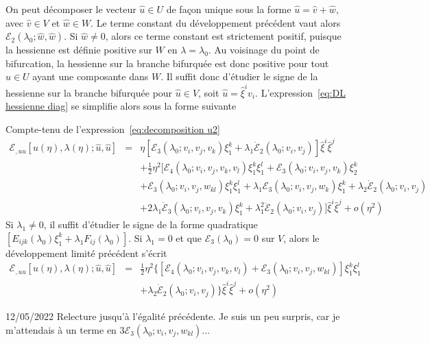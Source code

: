\documentclass{article}
\newcommand{\nobracket}{}
\newcommand{\nocomma}{}
\newcommand{\textdots}{...}
\begin{document}
On peut d{\'e}composer le vecteur $\hat{u} \in U$ de fa{\c c}on unique sous la
forme $\hat{u} = \hat{v} + \hat{w}$, avec $\hat{v} \in V$ et $\hat{w} \in W$.
Le terme constant du d{\'e}veloppement pr{\'e}c{\'e}dent vaut alors
$\mathcal{E}_2 (\lambda_0 ; \hat{w}, \hat{w})$. Si $\hat{w} \neq 0$, alors ce
terme constant est strictement positif, puisque la hessienne est d{\'e}finie
positive sur $W$ en $\lambda = \lambda_0$. Au voisinage du point de
bifurcation, la hessienne sur la branche bifurqu{\'e}e est donc positive pour
tout $\hat{u} \in U$ ayant une composante dans $W$. Il suffit donc
d'{\'e}tudier le signe de la hessienne sur la branche bifurqu{\'e}e pour
$\hat{u} \in V$, soit $\hat{u} = \hat{\xi}^i v_i$. L'expression~\eqref{eq:DL
hessienne diag} se simplifie alors sous la forme suivante

Compte-tenu de l'expression~\eqref{eq:decomposition u2}
\begin{eqnarray}
  \mathcal{E}_{, u \nocomma u} [u (\eta), \lambda (\eta) ; \hat{u}, \hat{u}] &
  = & \eta [\mathcal{E}_3 (\lambda_0 ; v_i, v_j, v_k) \xi_1^k + \lambda_1
  \dot{\mathcal{E}}_2 (\lambda_0 ; v_i, v_j)]  \hat{\xi}^i  \hat{\xi}^j
  \nonumber\\
  &  & + \tfrac{1}{2} \eta^2  [\mathcal{E}_4 (\lambda_0 ; v_i, v_j, v_k, v_l)
  \xi_1^k \xi_1^l +\mathcal{E}_3 (\lambda_0 ; v_i, v_j, v_k) \xi_2^k
  \nobracket \nonumber\\
  &  & +\mathcal{E}_3 (\lambda_0 ; v_i, v_j, w_{k \nocomma l}) \xi_1^k
  \xi_1^l + \lambda_1 \mathcal{E}_3 (\lambda_0 ; v_i, v_j, w_k) \xi_1^k +
  \lambda_2  \dot{\mathcal{E}}_2 (\lambda_0 ; v_i, v_j) \nonumber\\
  &  & \nobracket + 2 \lambda_1  \dot{\mathcal{E}}_3 (\lambda_0 ; v_i, v_j,
  v_k) \xi_1^k + \lambda_1^2  \ddot{\mathcal{E}}_2 (\lambda_0 ; v_i, v_j)]
  \hat{\xi}^i  \hat{\xi}^j + o (\eta^2) \nonumber
\end{eqnarray}
Si $\lambda_1 \neq 0$, il suffit d'{\'e}tudier le signe de la forme
quadratique $[E_{i \nocomma j \nocomma k} (\lambda_0) \xi_1^k + \lambda_1 F_{i
\nocomma j} (\lambda_0)] .$ Si $\lambda_1 = 0$ et que $\mathcal{E}_3
(\lambda_0) = 0$ sur $V$, alors le d{\'e}veloppement limit{\'e}
pr{\'e}c{\'e}dent s'{\'e}crit
\begin{eqnarray}
  \mathcal{E}_{, u \nocomma u} [u (\eta), \lambda (\eta) ; \hat{u}, \hat{u}] &
  = & \tfrac{1}{2} \eta^2  \{ [\mathcal{E}_4 (\lambda_0 ; v_i, v_j, v_k, v_l)
  \nobracket +\mathcal{E}_3 (\lambda_0 ; v_i, v_j, w_{k \nocomma l})] \xi_1^k
  \xi_1^l \nonumber\\
  &  & + \nobracket \lambda_2  \dot{\mathcal{E}}_2 (\lambda_0 ; v_i, v_j) \}
  \hat{\xi}^i  \hat{\xi}^j + o (\eta^2) \nonumber
\end{eqnarray}
\begin{tmframed}
  12/05/2022 Relecture jusqu'{\`a} l'{\'e}galit{\'e} pr{\'e}c{\'e}dente. Je
  suis un peu surpris, car je m'attendais {\`a} un terme en $3\mathcal{E}_3
  (\lambda_0 ; v_i, v_j, w_{k \nocomma l})${\textdots}
\end{tmframed}
\end{document}
